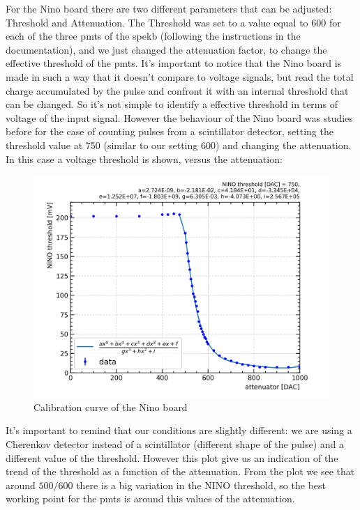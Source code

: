 \documentclass[10pt,a4paper]{article}
\begin{document}
For the Nino board there are two different parameters that can be adjusted: Threshold and Attenuation. The Threshold was set to a value equal to 600 for each of the three pmts of the spekb (following the instructions in the documentation), and we just changed the attenuation factor, to change the effective threshold of the pmts. It's important to notice that the Nino board is made in such a way that it doesn't compare to voltage signals, but read the total charge accumulated by the pulse and confront it with an internal threshold that can be changed. So it's not simple to identify a effective threshold in terms of voltage of the input signal. However the behaviour of the Nino board was studies before for the case of counting pulses from a scintillator detector, setting the threshold value at 750 (similar to our setting 600) and changing the attenuation. In this case a voltage threshold is shown, versus the attenuation: 

\begin{figure}[hbtp]
\centering
\includegraphics[scale= 0.8]{plotsNINOSchwelle/calibrationCurve_mVRange200.png}
\caption{Calibration curve of the Nino board}
\label{fig:Calibration}
\end{figure}

It's important to remind that our conditions are slightly different: we are using a Cherenkov detector instead of a scintillator (different shape of the pulse) and a different value of the threshold. However this plot give us an indication of the trend of the threshold as a function of the attenuation. From the plot we see that around $500/600$ there is a big variation in the NINO threshold, so the best working point for the pmts is around this values of the attenuation.
\end{document}
